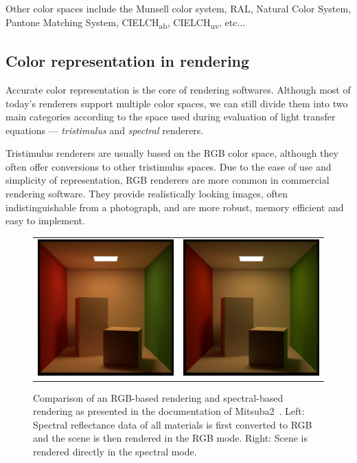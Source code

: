 Other color spaces include the Munsell color system, RAL, Natural Color System, Pantone Matching System, CIELCH\textsubscript{ab}, CIELCH\textsubscript{uv}, etc$\ldots$

\subsection{Color representation in rendering}

Accurate color representation is the core of rendering softwares. Although most of today's renderers support multiple color spaces, we can still divide them into two main categories according to the space used during evaluation of light transfer equations --- \emph{tristimulus} and \emph{spectral} renderers.

Tristimulus renderers are usually based on the RGB color space, although they often offer conversions to other tristimulus spaces. Due to the ease of use and simplicity of representation, RGB renderers are more common in commercial rendering software. They provide realistically looking images, often indistinguishable from a photograph, and are more robust, memory efficient and easy to implement.

\begin{figure}[t]
	\centering
	{\sffamily
		\begin{tabular}{cc}
			\includegraphics[width=0.45\linewidth]{img/mitsuba_rgb_mode.jpg}
			&
			\includegraphics[width=0.45\linewidth]{img/mitsuba_spectral_mode.jpg}\\
		\end{tabular}
	}
	\caption{Comparison of an RGB-based rendering and spectral-based rendering as presented in the documentation of Mitsuba2~\cite{Mitsuba2}. Left: Spectral reflectance data of all materials is first converted to RGB and the scene is then rendered in the RGB mode. Right: Scene is rendered directly in the spectral mode.}
	\label{fig:mitsubaRGBSpectralComparison}
\end{figure}

